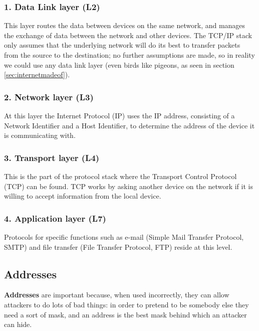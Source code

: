 
\subsubsection*{1. Data Link layer (L2)}
This layer routes the data between devices on the same network, and manages the exchange of data between the network and other devices. The TCP/IP stack only assumes that the underlying network will do its best to transfer packets from the
source to the destination; no further assumptions are made, so in reality we could use any data link layer (even birds like pigeons, as seen in section \ref{sec:internetmadeof}).


\subsubsection*{2. Network layer (L3)}
At this layer the Internet Protocol (IP) uses the IP address, consisting of a Network Identifier and a Host Identifier, to determine the address of the device it is communicating with.


\subsubsection*{3. Transport layer (L4)}
This is the part of the protocol stack where the Transport Control Protocol (TCP) can be found. TCP works by asking another device on the network if it is willing to accept information from the local device.


\subsubsection*{4. Application layer (L7)}
Protocols for specific functions such as e-mail (Simple Mail Transfer Protocol, SMTP) and file transfer (File Transfer Protocol, FTP) reside at this level.


\subsection{Addresses}
\textbf{Addresses} are important because, when used incorrectly, they can allow attackers to do lots of bad things: in order to pretend to be somebody else they need a sort of mask, and an address is the best mask behind which an attacker can hide.

